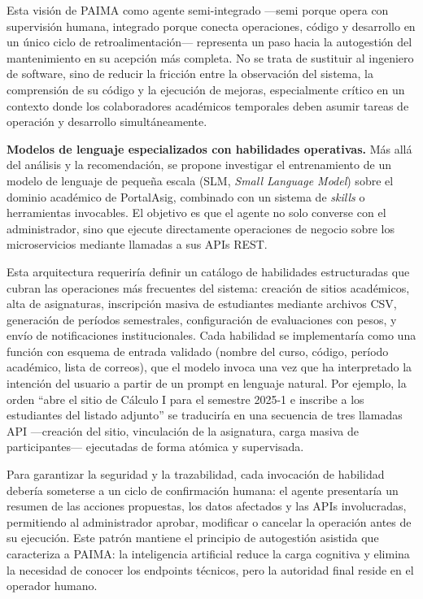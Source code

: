 Esta visión de PAIMA como agente semi-integrado ---semi porque opera con
supervisión humana, integrado porque conecta operaciones, código y desarrollo en
un único ciclo de retroalimentación--- representa un paso hacia la
autogestión del mantenimiento en su acepción más completa. No se trata de
sustituir al ingeniero de software, sino de reducir la fricción entre la
observación del sistema, la comprensión de su código y la ejecución de mejoras,
especialmente crítico en un contexto donde los colaboradores académicos temporales
deben asumir tareas de operación y desarrollo simultáneamente.

\textbf{Modelos de lenguaje especializados con habilidades operativas.} Más allá
del análisis y la recomendación, se propone investigar el entrenamiento de un
modelo de lenguaje de pequeña escala (SLM, \textit{Small Language Model}) sobre
el dominio académico de PortalAsig, combinado con un sistema de \textit{skills}
o herramientas invocables. El objetivo es que el agente no solo converse con el
administrador, sino que ejecute directamente operaciones de negocio sobre los
microservicios mediante llamadas a sus APIs REST.

Esta arquitectura requeriría definir un catálogo de habilidades estructuradas que
cubran las operaciones más frecuentes del sistema: creación de sitios académicos,
alta de asignaturas, inscripción masiva de estudiantes mediante archivos CSV,
generación de períodos semestrales, configuración de evaluaciones con pesos, y
envío de notificaciones institucionales. Cada habilidad se implementaría como una
función con esquema de entrada validado (nombre del curso, código, período
académico, lista de correos), que el modelo invoca una vez que ha interpretado la
intención del usuario a partir de un prompt en lenguaje natural. Por ejemplo, la
orden ``abre el sitio de Cálculo I para el semestre 2025-1 e inscribe a los
estudiantes del listado adjunto'' se traduciría en una secuencia de tres llamadas
API ---creación del sitio, vinculación de la asignatura, carga masiva de
participantes--- ejecutadas de forma atómica y supervisada.

Para garantizar la seguridad y la trazabilidad, cada invocación de habilidad
debería someterse a un ciclo de confirmación humana: el agente presentaría un
resumen de las acciones propuestas, los datos afectados y las APIs involucradas,
permitiendo al administrador aprobar, modificar o cancelar la operación antes de
su ejecución. Este patrón mantiene el principio de autogestión asistida que
caracteriza a PAIMA: la inteligencia artificial reduce la carga cognitiva y
elimina la necesidad de conocer los endpoints técnicos, pero la autoridad final
reside en el operador humano.


